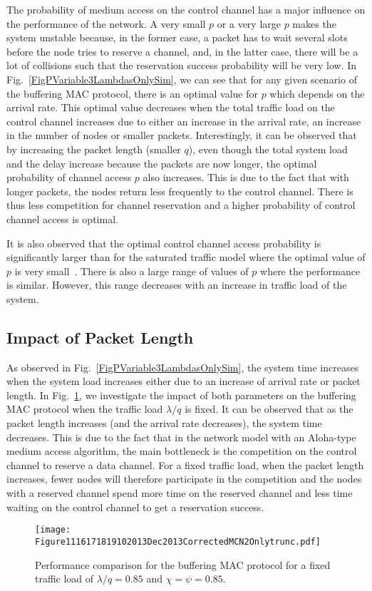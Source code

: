 \documentclass[12pt,journal,oneside,onecolumn]{IEEEtran}
\begin{document}
The probability of medium access on the control channel 
has a major influence on the performance of the network. 
A very small $p$ or a very large $p$ makes the system 
unstable because, in the former case, a packet has to 
wait several slots before the node tries to reserve a channel, 
and, in the latter case, there will be a lot of collisions such that the reservation success probability
will be very low. In Fig.~\ref{FigPVariable3LambdasOnlySim}, 
we can see that for any given scenario of the buffering MAC protocol, there is an optimal value for $p$ which depends
on the arrival rate. 
This optimal value decreases when the total traffic load on the control channel increases due
to either an increase in the arrival rate, an increase in the number of nodes or smaller packets.
Interestingly, it can be observed that by increasing the packet length (smaller $q$), 
even though the total system load and the delay increase because the packets are now longer, 
the optimal probability of channel access $p$ also increases. 
This is due to the fact that with longer packets, the nodes return less frequently to the control channel. There
is thus less competition for channel reservation and a higher probability of control channel access is optimal. 

It is also observed that the optimal control channel access probability is significantly
larger than for the saturated traffic model where the optimal value of $p$ is very small~\cite{pawelczak09}. There is also
a large range of values of $p$ where the performance is similar. However, this range decreases with an increase in traffic load of the system.


\subsection{Impact of Packet Length}


As observed in Fig.~\ref{FigPVariable3LambdasOnlySim}, the system time increases when
the system load increases either due to an increase of arrival rate or packet length.
In  Fig.~\ref{Figure1116171819102013}, we investigate the impact of both parameters on the buffering MAC protocol when the traffic load
$\lambda/q$ is fixed. It can be observed that as the packet length increases (and the arrival rate decreases),
the system time decreases. This is due to the fact that in the network model with an Aloha-type medium access algorithm,
the main bottleneck is the competition on the control channel to reserve a data channel. 
For a fixed traffic load, when the packet length increases, 
fewer nodes will therefore participate in the competition and the nodes with a reserved channel 
spend more time on the reserved channel and less time waiting on the control channel to get a reservation success.
\begin{figure}\texttt{[image: Figure1116171819102013Dec2013CorrectedMCN2Onlytrunc.pdf]}\caption{Performance comparison for the buffering MAC protocol for a fixed traffic load of $\lambda/q=0.85$ and $\chi=\psi=0.85$.}\label{Figure1116171819102013}\end{figure}
\end{document}
